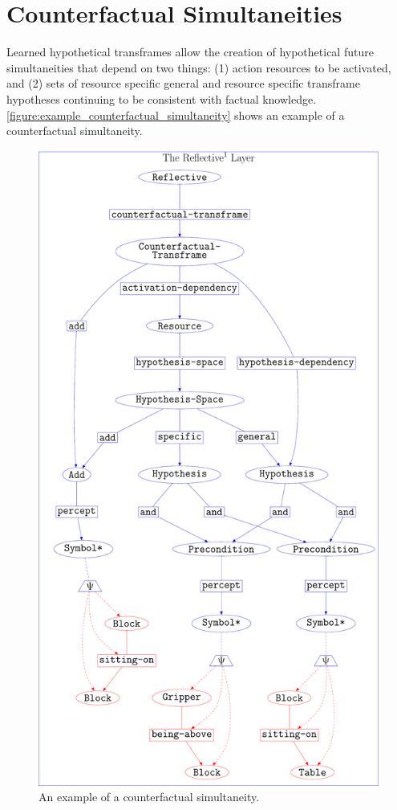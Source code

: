 \section{Counterfactual Simultaneities}

Learned hypothetical transframes allow the creation of hypothetical
future simultaneities that depend on two things: (1) action resources
to be activated, and (2) sets of resource specific general and
resource specific transframe hypotheses continuing to be consistent
with factual knowledge.
{\mbox{\autoref{figure:example_counterfactual_simultaneity}}} shows an
example of a counterfactual simultaneity.
\begin{figure}
\center
\includegraphics[width=12cm]{gfx/example_counterfactual_simultaneity}
\caption[An example of a counterfactual simultaneity.]{An example of a
  counterfactual simultaneity.}
\label{figure:example_counterfactual_simultaneity}
\end{figure}


